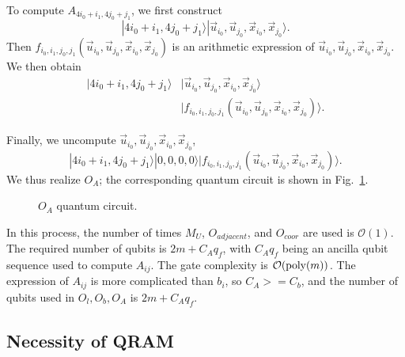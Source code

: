 \documentclass[%
 reprint,
 amsmath,amssymb,
pra,
]{revtex4-1}
\begin{document}
To compute $A_{4i_0+i_1,4j_0+j_1}$, we first construct
\begin{equation}
|4i_0+i_1,4j_0+j_1\rangle|\vec{u}_{i_0},\vec{u}_{j_0},\vec{x}_{i_0},\vec{x}_{j_0}\rangle.
\end{equation}
Then $f_{i_0,i_1,j_0,j_1}(\vec{u}_{i_0},\vec{u}_{j_0},\vec{x}_{i_0},\vec{x}_{j_0})$ is an arithmetic expression of $\vec{u}_{i_0},\vec{u}_{j_0},\vec{x}_{i_0},\vec{x}_{j_0}$. We then obtain
\begin{equation}
\begin{aligned}
|4i_0+i_1,4j_0+j_1\rangle&|\vec{u}_{i_0},\vec{u}_{j_0},\vec{x}_{i_0},\vec{x}_{j_0}\rangle\\
&|f_{i_0,i_1,j_0,j_1}(\vec{u}_{i_0},\vec{u}_{j_0},\vec{x}_{i_0},\vec{x}_{j_0})\rangle.
\end{aligned} 
\end{equation}

Finally, we uncompute $\vec{u}_{i_0},\vec{u}_{j_0},\vec{x}_{i_0},\vec{x}_{j_0}$,
\begin{equation}
|4i_0+i_1,4j_0+j_1\rangle|0,0,0,0\rangle
|f_{i_0,i_1,j_0,j_1}(\vec{u}_{i_0},\vec{u}_{j_0},\vec{x}_{i_0},\vec{x}_{j_0})\rangle.
\end{equation}
We thus realize $O_A$; the corresponding quantum circuit is shown in Fig.~\ref{fig:OA}.

\begin{figure}[htbp]
    \caption{$O_A$ quantum circuit. }
    \label{fig:OA}
\end{figure}

In this process, the number of times $M_U$, $O_{adjacent}$, and $O_{coor}$ are used is $\mathcal{O}(1)$. The required number of qubits is $2m+C_Aq_f$, with $C_Aq_f$ being an ancilla qubit sequence used to compute $A_{ij}$. The gate complexity is $\mathcal{O}({\rm poly}(m))$. The expression of $A_{ij}$ is more complicated than $b_i$, so $C_A>=C_b$, and the number of qubits used in $O_l,O_b,O_A$ is $2m+C_Aq_f$.

\subsection{Necessity of QRAM}\label{NecessityQRAM}
\end{document}
